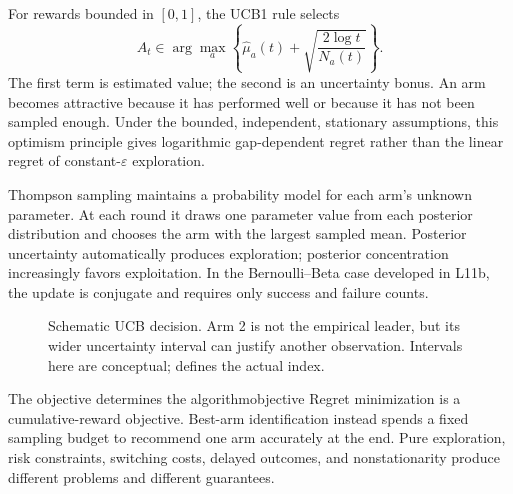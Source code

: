 \documentclass[11pt]{article}
\begin{document}
For rewards bounded in $[0,1]$, the UCB1 rule selects
\begin{equation}
  \label{eq:ucb}
  A_t\in\arg\max_a
  \left\{
    \widehat\mu_a(t)+\sqrt{\frac{2\log t}{N_a(t)}}
  \right\}.
\end{equation}
The first term is estimated value; the second is an uncertainty bonus. An arm becomes attractive because it has performed well or because it has not been sampled enough. Under the bounded, independent, stationary assumptions, this optimism principle gives logarithmic gap-dependent regret rather than the linear regret of constant-$\varepsilon$ exploration.

Thompson sampling maintains a probability model for each arm's unknown parameter. At each round it draws one parameter value from each posterior distribution and chooses the arm with the largest sampled mean. Posterior uncertainty automatically produces exploration; posterior concentration increasingly favors exploitation. In the Bernoulli--Beta case developed in L11b, the update is conjugate and requires only success and failure counts.

\begin{figure}[ht]
  \centering
  \caption{Schematic UCB decision. Arm 2 is not the empirical leader, but its wider uncertainty interval can justify another observation. Intervals here are conceptual;  defines the actual index.}
  \label{fig:ucb}
\end{figure}

\begin{remark}{The objective determines the algorithm}{objective}
Regret minimization is a cumulative-reward objective. Best-arm identification instead spends a fixed sampling budget to recommend one arm accurately at the end. Pure exploration, risk constraints, switching costs, delayed outcomes, and nonstationarity produce different problems and different guarantees.
\end{remark}
\end{document}
